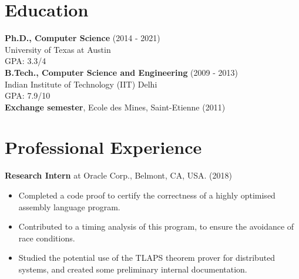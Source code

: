 \documentclass[margin]{res}
\begin{document}

\address{Department of Computer Science \\University of Texas at Austin }

\address{+1 512-952-0104 \\ \url{www.cs.utexas.edu/~mihir} }


\begin{resume}


\section{Education}
{\bf Ph.D., Computer Science} \hfill (2014 - 2021)\\
University of Texas at Austin\\
GPA: 3.3/4\\
{\bf B.Tech., Computer Science and Engineering} \hfill (2009 - 2013)\\
Indian Institute of Technology (IIT) Delhi\\
GPA: 7.9/10\\
{\bf Exchange semester}, Ecole des Mines, Saint-Etienne \hfill (2011)

\section{Professional Experience}

 {\bf Research Intern} at Oracle Corp., Belmont, CA, USA. \hfill (2018)
 \begin{itemize} \itemsep -2pt  %
 \item Completed a code proof to certify the correctness of a highly
   optimised assembly language program.
 \item Contributed to a timing analysis of this program, to ensure the
   avoidance of race conditions.
 \item Studied the potential use of the TLAPS theorem prover for
   distributed systems, and created some preliminary internal
   documentation.
 \end{itemize}


\end{resume}
\end{document}
